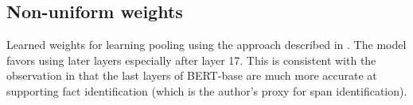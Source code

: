 \newpage

\subsection{Non-uniform weights}

Learned weights for learning pooling using the approach described in \cite{tenney-etal-2019-bert}. The model favors using later layers especially after layer 17. This is consistent with the observation in \cite{van_Aken_2019} that the last layers of BERT-base are much more accurate at supporting fact identification (which is the author’s proxy for span identification).

